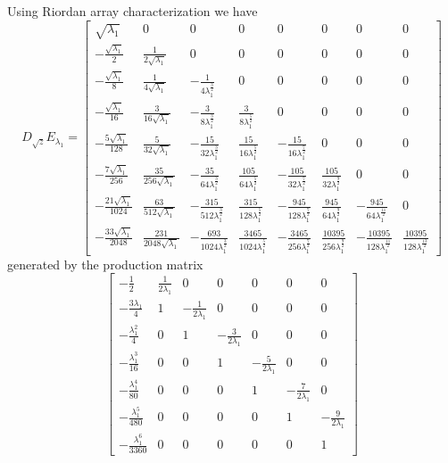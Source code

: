 Using Riordan array characterization we have 
\begin{displaymath}
D_{\sqrt{z}}E_{\lambda_{1}} = \left[\begin{matrix}\sqrt{\lambda_{1}} & 0 & 0 & 0 & 0 & 0 & 0 & 0\\- \frac{\sqrt{\lambda_{1}}}{2} & \frac{1}{2 \sqrt{\lambda_{1}}} & 0 & 0 & 0 & 0 & 0 & 0\\- \frac{\sqrt{\lambda_{1}}}{8} & \frac{1}{4 \sqrt{\lambda_{1}}} & - \frac{1}{4 \lambda_{1}^{\frac{3}{2}}} & 0 & 0 & 0 & 0 & 0\\- \frac{\sqrt{\lambda_{1}}}{16} & \frac{3}{16 \sqrt{\lambda_{1}}} & - \frac{3}{8 \lambda_{1}^{\frac{3}{2}}} & \frac{3}{8 \lambda_{1}^{\frac{5}{2}}} & 0 & 0 & 0 & 0\\- \frac{5 \sqrt{\lambda_{1}}}{128} & \frac{5}{32 \sqrt{\lambda_{1}}} & - \frac{15}{32 \lambda_{1}^{\frac{3}{2}}} & \frac{15}{16 \lambda_{1}^{\frac{5}{2}}} & - \frac{15}{16 \lambda_{1}^{\frac{7}{2}}} & 0 & 0 & 0\\- \frac{7 \sqrt{\lambda_{1}}}{256} & \frac{35}{256 \sqrt{\lambda_{1}}} & - \frac{35}{64 \lambda_{1}^{\frac{3}{2}}} & \frac{105}{64 \lambda_{1}^{\frac{5}{2}}} & - \frac{105}{32 \lambda_{1}^{\frac{7}{2}}} & \frac{105}{32 \lambda_{1}^{\frac{9}{2}}} & 0 & 0\\- \frac{21 \sqrt{\lambda_{1}}}{1024} & \frac{63}{512 \sqrt{\lambda_{1}}} & - \frac{315}{512 \lambda_{1}^{\frac{3}{2}}} & \frac{315}{128 \lambda_{1}^{\frac{5}{2}}} & - \frac{945}{128 \lambda_{1}^{\frac{7}{2}}} & \frac{945}{64 \lambda_{1}^{\frac{9}{2}}} & - \frac{945}{64 \lambda_{1}^{\frac{11}{2}}} & 0\\- \frac{33 \sqrt{\lambda_{1}}}{2048} & \frac{231}{2048 \sqrt{\lambda_{1}}} & - \frac{693}{1024 \lambda_{1}^{\frac{3}{2}}} & \frac{3465}{1024 \lambda_{1}^{\frac{5}{2}}} & - \frac{3465}{256 \lambda_{1}^{\frac{7}{2}}} & \frac{10395}{256 \lambda_{1}^{\frac{9}{2}}} & - \frac{10395}{128 \lambda_{1}^{\frac{11}{2}}} & \frac{10395}{128 \lambda_{1}^{\frac{13}{2}}}\end{matrix}\right]
\end{displaymath}
generated by the production matrix
\begin{displaymath}
\left[\begin{matrix}- \frac{1}{2} & \frac{1}{2 \lambda_{1}} & 0 & 0 & 0 & 0 & 0\\- \frac{3 \lambda_{1}}{4} & 1 & - \frac{1}{2 \lambda_{1}} & 0 & 0 & 0 & 0\\- \frac{\lambda_{1}^{2}}{4} & 0 & 1 & - \frac{3}{2 \lambda_{1}} & 0 & 0 & 0\\- \frac{\lambda_{1}^{3}}{16} & 0 & 0 & 1 & - \frac{5}{2 \lambda_{1}} & 0 & 0\\- \frac{\lambda_{1}^{4}}{80} & 0 & 0 & 0 & 1 & - \frac{7}{2 \lambda_{1}} & 0\\- \frac{\lambda_{1}^{5}}{480} & 0 & 0 & 0 & 0 & 1 & - \frac{9}{2 \lambda_{1}}\\- \frac{\lambda_{1}^{6}}{3360} & 0 & 0 & 0 & 0 & 0 & 1\end{matrix}\right]
\end{displaymath}
